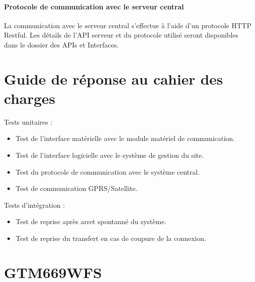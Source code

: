 \paragraph{Protocole de communication avec le serveur central}

La communication avec le serveur central s'effectue à l'aide d'un protocole HTTP Restful\footnotemark. Les détails de l'API serveur et du protocole utilisé seront disponibles dans le dossier des APIs et Interfaces.


\section{Guide de réponse au cahier des charges}

Tests unitaires :

\begin{itemize}
\item Test de l'interface matérielle avec le module matériel de communication.
\item Test de l'interface logicielle avec le système de gestion du site.
\item Test du protocole de communication avec le système central.
\item Test de communication GPRS/Satellite.
\end{itemize}

Tests d'intégration :

\begin{itemize}
\item Test de reprise après arret spontanné du système.
\item Test de reprise du transfert en cas de coupure de la connexion.
\end{itemize}

\newpage
\appendix
\appendixpage

\section{GTM669WFS}

\begin{figure}[H]
\label{fig:3g}
\end{figure}

